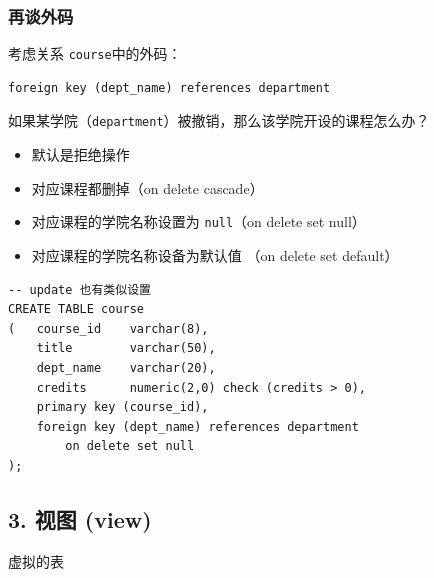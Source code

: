 \documentclass[aspectratio=169, 14pt]{beamer}
\begin{document}
\begin{frame}[fragile]
    \frametitle{再谈外码}

考虑关系 \texttt{course}中的外码：

\begin{verbatim}
foreign key (dept_name) references department 
\end{verbatim}

如果某学院（\texttt{department}）被撤销，那么该学院开设的课程怎么办？
\pause
\begin{itemize}
    \item 默认是拒绝操作
    \item 对应课程都删掉（\alert{on delete cascade}）
    \item 对应课程的学院名称设置为 \texttt{null}（\alert{on delete set null}）
    \item 对应课程的学院名称设备为默认值 （\alert{on delete set default}）    
\end{itemize}

\end{frame}

\begin{frame}[fragile]

    \begin{verbatim}
-- update 也有类似设置
CREATE TABLE course
(   course_id    varchar(8), 
    title        varchar(50), 
    dept_name    varchar(20),
    credits      numeric(2,0) check (credits > 0),
    primary key (course_id),
    foreign key (dept_name) references department
        on delete set null
);
    \end{verbatim}
\end{frame}

\begin{frame}
    \section{\textcolor{darkmidnightblue}{3. 视图 (view)}} 
    虚拟的表
\end{frame}
\end{document}
